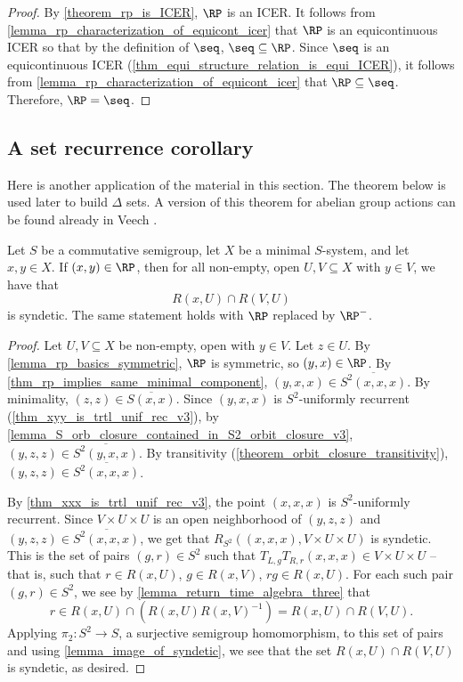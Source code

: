 \begin{proof}
\leanok{}
    By \cref{theorem_rp_is_ICER}, $\RP$ is an ICER.  It follows from \cref{lemma_rp_characterization_of_equicont_icer} that $\RP$ is an equicontinuous ICER so that by the definition of $\seq$, $\seq \subseteq \RP$.  Since $\seq$ is an equicontinuous ICER (\cref{thm_equi_structure_relation_is_equi_ICER}), it follows from \cref{lemma_rp_characterization_of_equicont_icer} that $\RP \subseteq \seq$.  Therefore, $\RP = \seq$.
\end{proof}

\subsection{A set recurrence corollary}

Here is another application of the material in this section. The theorem below is used later to build $\Delta$ sets.  A version of this theorem for abelian group actions can be found already in Veech \cite{veech_1968}.

\begin{theorem}
\label{thm_delta_set_builder_prestep}
\leanok{}
    Let $S$ be a commutative semigroup, let $X$ be a minimal $S$-system, and let $x, y \in X$.  If $(x,y) \in \RP$, then for all non-empty, open $U, V \subseteq X$ with $y \in V$, we have that
    \[R(x,U) \cap R(V,U)\]
    is syndetic. The same statement holds with $\RP$ replaced by $\RP^-$.
\end{theorem}

\begin{proof}
\leanok{}
    Let $U, V \subseteq X$ be non-empty, open with $y \in V$.  Let $z \in U$.  By \cref{lemma_rp_basics_symmetric}, $\RP$ is symmetric, so $(y,x) \in \RP$.  By \cref{thm_rp_implies_same_minimal_component}, $(y,x,x) \in \overline{S^2 (x,x,x)}$. By minimality, $(z,z) \in \overline{S(x,x)}$.  Since $(y,x,x)$ is $S^2$-uniformly recurrent (\cref{thm_xyy_is_trtl_unif_rec_v3}), by \cref{lemma_S_orb_closure_contained_in_S2_orbit_closure_v3}, $(y,z,z) \in \overline{S^2(y,x,x)}$.  By transitivity (\cref{theorem_orbit_closure_transitivity}), $(y,z,z) \in \overline{S^2 (x,x,x)}$.
    
    By \cref{thm_xxx_is_trtl_unif_rec_v3}, the point $(x,x,x)$ is $S^2$-uniformly recurrent.  Since $V \times U \times U$ is an open neighborhood of $(y,z,z)$ and $(y,z,z) \in \overline{S^2 (x,x,x)}$, we get that $R_{S^2}((x,x,x), V \times U \times U)$ is syndetic. This is the set of pairs $(g,r) \in S^2$ such that $T_{L,g} T_{R,r} (x,x,x) \in V \times U \times U$ -- that is, such that $r \in R(x,U)$, $g \in R(x,V)$, $rg \in R(x,U)$.  For each such pair $(g,r) \in S^2$, we see by \cref{lemma_return_time_algebra_three} that
    \[r \in R(x,U) \cap (R(x,U) R(x,V)^{-1}) = R(x,U) \cap R(V,U).\]
    Applying $\pi_2: S^2 \to S$, a surjective semigroup homomorphism, to this set of pairs and using \cref{lemma_image_of_syndetic}, we see that the set $R(x,U) \cap R(V,U)$ is syndetic, as desired.
\end{proof}

